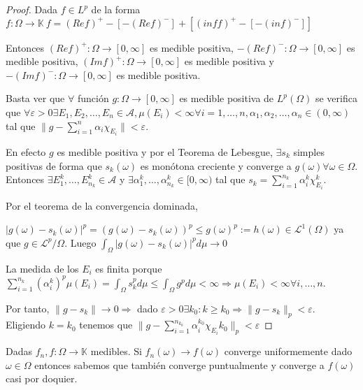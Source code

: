\begin{proof}
  Dada $f \in L^{p}$ de la forma $f: \Omega \rightarrow \mathbb K \ f =
  (Ref)^{+} - [-(Ref)^{-}] + [(inf f)^{+}- [-(inf)^{-}]]$

  Entonces $(Ref)^{+}: \Omega \rightarrow [0, \infty]$ es medible positiva,
  $-(Ref)^{-}: \Omega \rightarrow [0, \infty]$ es medible positiva, $(Imf)^{+}:
  \Omega \rightarrow [0, \infty]$ es medible positiva y $-(Imf)^{-}: \Omega
  \rightarrow [0, \infty]$ es medible positiva.

  Basta ver que $\forall$ función $g: \Omega \rightarrow [0, \infty]$ es medible
  positiva de $L^{p}(\Omega)$ se verifica que $\forall \varepsilon > 0 \exists
  E_{1}, E_{2}, \hdots,E_{n} \in \mathscr A, \mu(E_{i}) < \infty \forall i = 1,
  \hdots, n, \alpha_{1}, \alpha_{2}, \hdots, \alpha_{n} \in (0, \infty)$ tal que
  $\|g - \sum_{i=1}^{n} \alpha_{i}\chi_{E_{i}}\| < \varepsilon$.

  En efecto $g$ es medible positiva y por el Teorema de Lebesgue, $\exists
  {s_{k}}$ simples positivas de forma que $s_{k}(\omega)$ es monótona creciente
  y converge a $g(\omega) \forall \omega \in \Omega$. Entonces $\exists
  E_{1}^{k}, \hdots, E_{n_{k}}^{k} \in \mathscr A$ y $\exists \alpha_{1}^{k},
  \hdots, \alpha_{n_{k}}^{k} \in [0, \infty)$ tal que $s_{k} =
  \sum_{i=1}^{n_{k}}\alpha_{i}^{k}\chi_{E_{i}}^{k}$.

  Por el teorema de la convergencia dominada,

  $|g(\omega) - s_{k}(\omega)|^{p} = (g(\omega) - s_{k}(\omega))^{p} \leq
  g(\omega)^{p}:= h(\omega) \in \mathcal L^{1}(\Omega)$ ya que $g \in \mathcal
  L^{p}/\Omega$. Luego $\int_{\Omega}|g(\omega) - s_{k}(\omega)|^{p}d\mu
  \rightarrow 0$

  La medida de los $E_{i}$ es finita porque
  $\sum_{i=1}^{n_{k}}(\alpha_{i}^{k})^{p}\mu(E_{i}) = \int_{\Omega}s_{k}^{p}d\mu
  \leq \int_{\Omega}g^{p}d\mu < \infty \Rightarrow \mu(E_{i}) < \infty \forall
  i, \hdots, n$.

  Por tanto, $\|g-s_{k}\| \rightarrow 0 \Rightarrow$ dado $\varepsilon > 0
  \exists k_{0} : k  \geq k_{0} \Rightarrow \|g-s_{k}\|_{p} <
  \varepsilon$. Eligiendo $k = k_{0}$ tenemos que $\|g -
  \sum_{i=1}^{n_{k_{0}}}\alpha_{i}^{k_{0}}\chi_{E_{i}}k_{0}\|_{p} < \varepsilon$
\end{proof}

Dadas $f_{n}, f : \Omega \rightarrow \mathbb K$ medibles. Si ${f_{n}(\omega)}
\rightarrow f(\omega)$ converge uniformemente dado $\omega \in \Omega$ entonces
sabemos que también converge puntualmente y converge a $f(\omega)$ casi por
doquier.


